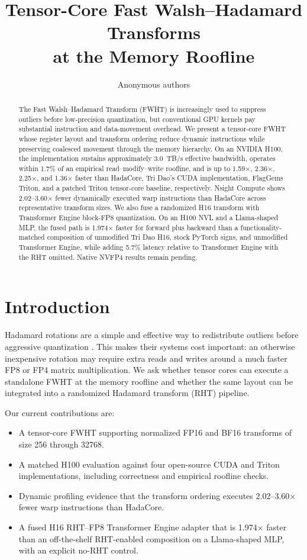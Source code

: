 \documentclass{article}
\title{Tensor-Core Fast Walsh--Hadamard Transforms\\at the Memory Roofline}
\author{Anonymous authors}
\begin{document}
\maketitle

\begin{abstract}
The Fast Walsh--Hadamard Transform (FWHT) is increasingly used to suppress
outliers before low-precision quantization, but conventional GPU kernels pay
substantial instruction and data-movement overhead. We present a tensor-core
FWHT whose register layout and transform ordering reduce dynamic instructions
while preserving coalesced movement through the memory hierarchy. On an
NVIDIA H100, the implementation sustains approximately 3.0~TB/s effective
bandwidth, operates within 1.7\% of an empirical read--modify--write roofline,
and is up to 1.59$\times$, 2.36$\times$, 2.25$\times$, and 1.36$\times$ faster
than HadaCore, Tri Dao's CUDA implementation, FlagGems Triton, and a patched
Triton tensor-core baseline, respectively. Nsight Compute shows
2.02--3.60$\times$ fewer dynamically executed warp instructions than HadaCore
across representative transform sizes. We also fuse a randomized H16 transform
with Transformer Engine block-FP8 quantization. On an H100 NVL and a
Llama-shaped MLP, the
fused path is 1.974$\times$ faster for forward plus backward than a
functionality-matched composition of unmodified Tri Dao H16, stock PyTorch
signs, and unmodified Transformer Engine, while adding 5.7\% latency relative
to Transformer Engine with the RHT omitted. Native NVFP4 results remain pending.
\end{abstract}

\section{Introduction}
Hadamard rotations are a simple and effective way to redistribute outliers
before aggressive quantization \citep{TODO_hadamard_quantization}. This makes
their systems cost important:
an otherwise inexpensive rotation may require extra reads and writes around a
much faster FP8 or FP4 matrix multiplication. We ask whether tensor cores can
execute a standalone FWHT at the memory roofline and whether the same layout
can be integrated into a randomized Hadamard transform (RHT) pipeline.

Our current contributions are:
\begin{itemize}
  \item A tensor-core FWHT supporting normalized FP16 and BF16 transforms of
        size 256 through 32768.
  \item A matched H100 evaluation against four open-source CUDA and Triton
        implementations, including correctness and empirical roofline checks.
  \item Dynamic profiling evidence that the transform ordering executes
        2.02--3.60$\times$ fewer warp instructions than HadaCore.
  \item A fused H16 RHT--FP8 Transformer Engine adapter that is 1.974$\times$
        faster than an off-the-shelf RHT-enabled composition on a Llama-shaped
        MLP, with an explicit no-RHT control.
\end{itemize}
\end{document}
